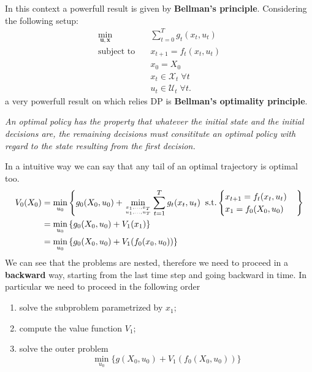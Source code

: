 In this context a powerfull result is given by \textbf{Bellman's principle}. Considering the following setup:
\begin{align*}
    \min_{\mathbf{u,x}} \quad &\sum_{t=0}^T g_t (x_t,u_t)\\
    \text{subject to} \quad &x_{t+1} = f_t(x_t,u_t)\\
                       &x_0 = X_0\\
                       &x_t \in \mathcal{X}_t \;\forall t\\
                       &u_t \in \mathcal{U}_t \; \forall t.
\end{align*}
a very powerfull result on which relies DP is \textbf{Bellman's optimality principle}.
\begin{theorembox}
\textit{An optimal policy has the property that whatever the initial state and the initial decisions are, the remaining decisions must consititute an optimal policy with regard to the state resulting from the first decision.}
\end{theorembox}
In a intuitive way we can say that any tail of an optimal trajectory is optimal too.\\
\begin{align*}
V_0(X_0)
&=
\min_{u_0}
\left\{
g_0(X_0,u_0 )
+
\min_{x_1,\dots,x_T \atop u_1,\dots,u_T}
\sum_{t=1}^{T} g_t(x_t,u_t)
\;\;
\text{s.t.}
\begin{cases}
x_{t+1} = f_t(x_t,u_t) \\
x_1 = f_0(X_0,u_0)
\end{cases}
\right\}
\\&= 
\min_{u_0}
\left\{
g_0(X_0,u_0)
+
V_1(x_1)
\right\}
\\&=
\min_{u_0}
\left\{
g_0(X_0,u_0)
+
V_1(f_0(x_0,u_0))
\right\}
\end{align*}
We can see that the problems are nested, therefore we need to proceed in a \textbf{backward} way, starting from the last time step and going backward in time. In particular we need to proceed in the following order
\begin{enumerate}
    \item solve the subproblem parametrized by $x_1$;
    \item compute the value function $V_1$;
    \item solve the outer problem 
    $$\min_{u_0} \{ g(X_0,u_0)+V_1(f_0(X_0,u_0)) \}$$
\end{enumerate}

